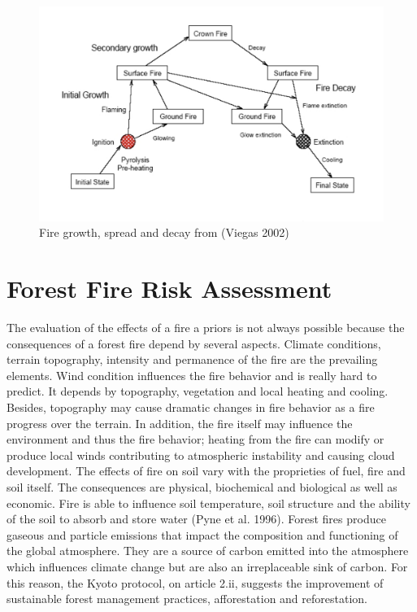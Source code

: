 {{{	\begin{figure}[H]
		\centering
		\includegraphics[width=0.9\linewidth]{images/fire_types.png}
		\caption{Fire growth, spread and decay from (Viegas 2002)}
		\label{fig:fire_types}
	\end{figure}

\section{Forest Fire Risk Assessment}
	The evaluation of the effects of a fire a priors is not always possible because the consequences of a forest fire depend by several aspects. Climate conditions, terrain topography, intensity and permanence of the fire are the prevailing elements. Wind condition influences the fire behavior and is really hard to predict. It depends by topography, vegetation and local heating and cooling. Besides, topography may cause dramatic changes in fire behavior as a fire progress over the terrain. In addition, the fire itself may influence the environment and thus the fire behavior; heating from the fire can modify or produce local winds contributing to atmospheric instability and causing cloud development. The effects of fire on soil vary with the proprieties of fuel, fire and soil itself. The consequences are physical, biochemical and biological as well as economic. Fire is able to influence soil temperature, soil structure and the ability of the soil to absorb and store water (Pyne et al. 1996). Forest fires produce gaseous and particle emissions that impact the composition and functioning of the global atmosphere. They are a source of carbon emitted into the atmosphere which influences climate change but are also an irreplaceable sink of carbon. For this reason, the Kyoto protocol, on article 2.ii, suggests the improvement of sustainable forest management practices, afforestation and reforestation.
	
}}}
